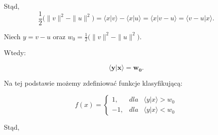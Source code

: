 Stąd,
\begin{equation}
    \frac{1}{2} \big( \|v\|^{2} - \|u\|^{2} \big) = \big \langle x|v \big \rangle - \big \langle x|u \big \rangle = \big \langle x|v - u \big \rangle = \big \langle v - u|x \big \rangle.
\end{equation}

Niech $y = v - u$ oraz $w_{0} = \frac{1}{2} \bigg(\|v\|^{2} - \|u\|^{2}\bigg).$ 

Wtedy:

\begin{equation*}
\bm{\big \langle y|x \big \rangle = w_{0}}.
\end{equation*}

Na tej podstawie możemy zdefiniować funkcje klasyfikującą:

\begin{equation}
f(x) =\left\{\begin{matrix}
1, & dla  & \big \langle y|x \big \rangle > w_{0} \\ 
-1,& dla & \big \langle y|x \big \rangle < w_{0}  
\end{matrix}\right.
\end{equation}

Stąd,

